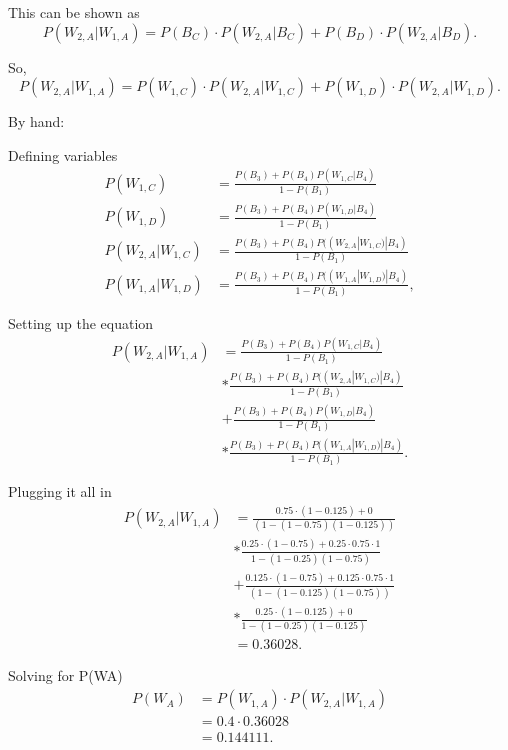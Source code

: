 \documentclass[11pt]{article}
\begin{document}
This can be shown as
\begin{equation*}
    P(W_{2,A} | W_{1,A}) = P(B_C) \cdot P(W_{2,A} | B_C) + P(B_D) \cdot P(W_{2,A} | B_D).
\end{equation*}

So,
\begin{equation*}
    P(W_{2,A} | W_{1,A}) = P(W_{1,C}) \cdot P(W_{2,A} | W_{1,C}) + P(W_{1,D}) \cdot P(W_{2,A} | W_{1,D}).
\end{equation*}

By hand:

Defining variables
\begin{align*}
    P(W_{1,C}) &= \frac{P(B_3)+ P(B_4)P(W_{1,C} | B_4)}{1 - P(B_1)}\\
    P(W_{1,D}) &= \frac{P(B_3) + P(B_4)P(W_{1,D} | B_4)}{1 - P(B_1)}\\
    P(W_{2,A} | W_{1,C}) &= \frac{P(B_3) + P(B_4)P((W_{2,A} | W_{1,C}) | B_4)}{1 - P(B_1)}\\
    P(W_{1,A} | W_{1,D}) &= \frac{P(B_3) + P(B_4)P((W_{1,A} | W_{1,D}) | B_4)}{1 - P(B_1)},
\end{align*}

Setting up the equation
\begin{align*}
    P(W_{2,A} | W_{1,A}) &= \frac{P(B_3)+ P(B_4)P(W_{1,C} | B_4)}{1 - P(B_1)}\\
    &* \frac{P(B_3) + P(B_4)P((W_{2,A} | W_{1,C}) | B_4)}{1 - P(B_1)}\\
    &+ \frac{P(B_3) + P(B_4)P(W_{1,D} | B_4)}{1 - P(B_1)}\\
    &* \frac{P(B_3) + P(B_4)P((W_{1,A} | W_{1,D}) | B_4)}{1 - P(B_1)}.
\end{align*}

Plugging it all in
\begin{align*}
    P(W_{2,A} | W_{1,A}) &= \frac{0.75 \cdot (1-0.125) + 0}{(1 - (1-0.75)(1-0.125))}\\
    &* \frac{0.25 \cdot (1-0.75) + 0.25 \cdot 0.75 \cdot 1}{1-(1-0.25)(1-0.75)}\\
    &+ \frac{0.125 \cdot (1-0.75) + 0.125 \cdot 0.75 \cdot 1}{(1 - (1-0.125)(1-0.75))} \\
    &* \frac{0.25 \cdot (1-0.125) + 0}{1-(1-0.25)(1-0.125)}\\
    &= 0.36028.
\end{align*}


Solving for P(WA)
\begin{align*}
    P(W_A) &= P(W_{1,A}) \cdot P(W_{2,A} | W_{1,A})\\
    &= 0.4 \cdot 0.36028\\
    &= 0.144111.
\end{align*}
\end{document}
